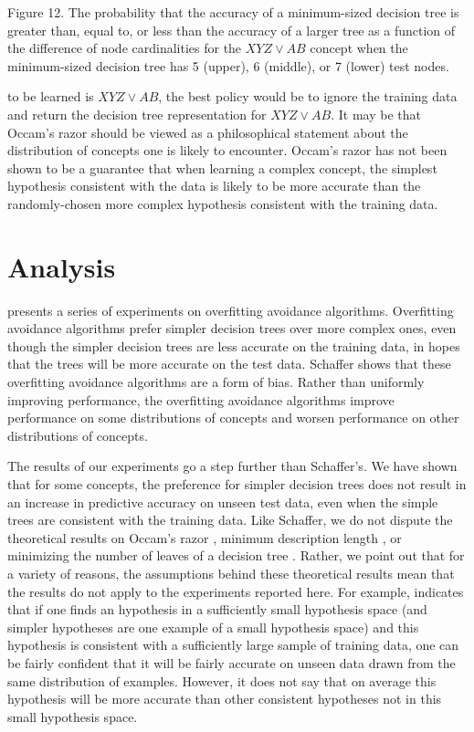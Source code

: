\vspace{0.2cm}
\parindent 0.0cm
Figure 12. The probability that the accuracy of a minimum-sized
decision tree is greater than, equal to, or less than the accuracy of a
larger tree as a function of the difference of node cardinalities for
the $XYZ \vee AB$ concept when the minimum-sized decision tree has 
5 (upper), 6 (middle), or 7 (lower) test nodes.\\
\parindent 0.6cm
\parskip 0.0cm

\noindent
to be learned is $XYZ \vee AB$, the best policy would be to ignore 
the training data and return
the decision tree representation for $XYZ \vee AB$. It may be that
Occam's razor should be viewed as a philosophical statement about the
distribution of concepts one is likely to encounter. Occam's razor has
not been shown to be a guarantee that when learning a complex concept,
the simplest hypothesis consistent with the data is likely to be more
accurate than the randomly-chosen more complex hypothesis consistent
with the training data.

\section{Analysis}

 presents a series of experiments on overfitting
avoidance algorithms.  Overfitting avoidance algorithms prefer simpler
decision trees over more complex ones, even though the simpler
decision trees are less accurate on the training data, in hopes that
the trees will be more accurate on the test data.  Schaffer shows that
these overfitting avoidance algorithms are a form of bias. Rather than
uniformly improving performance, the overfitting avoidance algorithms
improve performance on some distributions of concepts and worsen
performance on other distributions of concepts.

The results of our experiments go a step further than Schaffer's.
We have shown that for some concepts, the preference for simpler
decision trees does not result in an increase in
predictive accuracy on unseen test data, even when the simple trees
are consistent with the training data.  Like Schaffer, we do not
dispute the theoretical results on Occam's razor \cite{blumer87},
minimum description length \cite{quinlan89,muggleton92}, 
or minimizing the number of leaves of a decision tree
\cite{fayyad90}.  Rather, we point out that for a variety of
reasons, the assumptions behind these theoretical results mean that the
results do not apply to the experiments reported here.
For example,  indicates that if one finds an
hypothesis in a sufficiently small hypothesis space (and simpler
hypotheses are one example of a small hypothesis space) and this
hypothesis is consistent with a sufficiently large sample of training
data, one can be fairly confident that it will be fairly accurate
on unseen data drawn from the same distribution of examples.  However,
it does not say that on average this hypothesis will be more accurate
than other consistent hypotheses not in this small hypothesis space.

